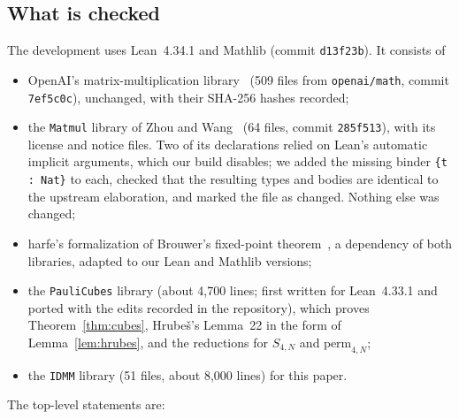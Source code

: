 \documentclass[11pt]{article}
\theoremstyle{definition}
\theoremstyle{remark}
\newcommand{\lean}[1]{\texttt{#1}}
\begin{document}
\subsection{What is checked}
The development uses Lean~4.34.1 and Mathlib (commit \texttt{d13f23b}). It consists of
\begin{itemize}
\item OpenAI's matrix-multiplication library~\cite{OAI2026lean} (509 files from \texttt{openai/math}, commit
\texttt{7ef5c0c}), unchanged, with their SHA-256 hashes recorded;
\item the \lean{Matmul} library of Zhou and Wang~\cite{ZhouWang2026} (64 files, commit \texttt{285f513}), with its
license and notice files. Two of its declarations relied on Lean's automatic implicit arguments, which our build
disables; we added the missing binder \lean{\{t : Nat\}} to each, checked that the resulting types and bodies are
identical to the upstream elaboration, and marked the file as changed. Nothing else was changed;
\item harfe's formalization of Brouwer's fixed-point theorem~\cite{harfe2026}, a dependency of both libraries,
adapted to our Lean and Mathlib versions;
\item the \lean{PauliCubes} library (about 4{,}700 lines; first written for Lean~4.33.1 and ported with the
edits recorded in the repository), which proves Theorem~\ref{thm:cubes}, Hrube\v{s}'s
Lemma~22 in the form of Lemma~\ref{lem:hrubes}, and the reductions for $S_{4,N}$ and $\mathrm{perm}_{4,N}$;
\item the \lean{IDMM} library (51 files, about 8{,}000 lines) for this paper.
\end{itemize}
The top-level statements are:
\end{document}
